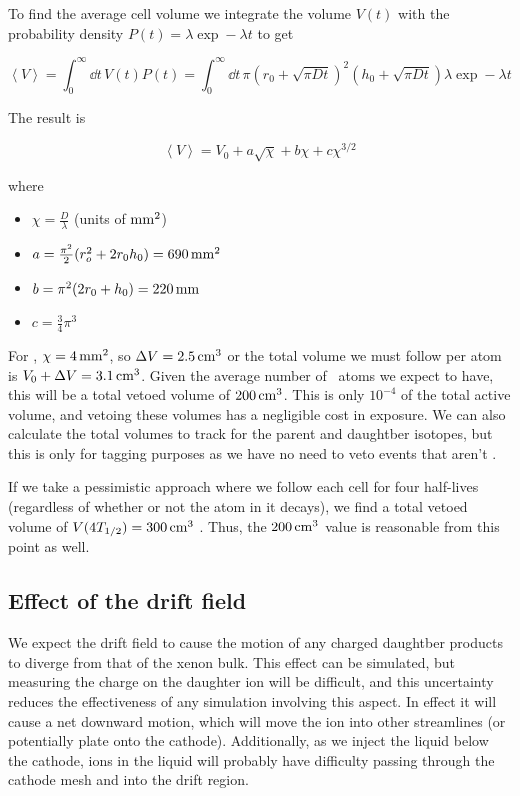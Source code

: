 To find the average cell volume we integrate the volume $V(t)$ with the probability density $P(t) = \lambda \exp -\lambda t$ to get

\begin{equation}
\left< V \right> = \int_0^{\infty} \dd t\,V(t) P(t) = \int_0^{\infty} \dd t\,\pi(r_0 + \sqrt{\pi Dt})^2(h_0 + \sqrt{\pi Dt})\lambda\exp -\lambda t
\end{equation}

The result is

\begin{equation}
\left< V \right> = V_0 + a\sqrt{\chi} + b\chi + c\chi^{3/2}
\end{equation}

where
\begin{itemize}
    \item $\chi = \frac{D}{\lambda}$ (units of $\mathrm{mm^2}$)
    \item $a = \frac{\pi^{2}}{2} (r_o^2+2 r_0 h_0) = 690\, \mathrm{mm^2}$
    \item $b = \pi^2 (2r_0 + h_0) = 220\, \mathrm{mm}$
    \item$c = \frac{3}{4} \pi^{3}$
\end{itemize}

For \Pb, $\chi = 4\, \mathrm{mm^2}$, so $\Delta V = 2.5\, \mathrm{cm^3}$ or the total volume we must follow per atom is $V_0 + \Delta V = 3.1\, \mathrm{cm^3}$. Given the average number of \Pb~atoms we expect to have, this will be a total vetoed volume of $200\, \mathrm{cm^3}$. This is only $10^{-4}$ of the total active volume, and vetoing these volumes has a negligible cost in exposure. We can also calculate the total volumes to track for the parent and daughtber isotopes, but this is only for tagging purposes as we have no need to veto events that aren't \Pb.

If we take a pessimistic approach where we follow each cell for four half-lives (regardless of whether or not the atom in it decays), we find a total vetoed volume of $V(4T_{1/2}) = 300\, \mathrm{cm^3}$ . Thus, the $200\, \mathrm{cm^3}$ value is reasonable from this point as well.

\subsection{Effect of the drift field}

We expect the drift field to cause the motion of any charged daughtber products to diverge from that of the xenon bulk. This effect can be simulated, but measuring the charge on the daughter ion will be difficult, and this uncertainty reduces the effectiveness of any simulation involving this aspect. In effect it will cause a net downward motion, which will move the ion into other streamlines (or potentially plate onto the cathode). Additionally, as we inject the liquid below the cathode, ions in the liquid will probably have difficulty passing through the cathode mesh and into the drift region.

